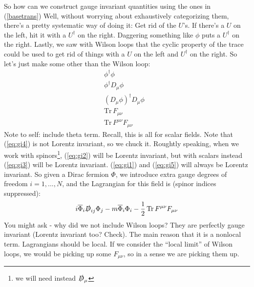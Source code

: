 \documentclass[main.tex]{subfiles}
\begin{document}
So how can we construct gauge invariant quantities using the ones in (\ref{basetrans}) Well, without worrying about exhaustively categorizing them, there's a pretty systematic way of doing it: Get rid of the $U$'s. If there's a $U$ on the left, hit it with a $U^\dagger$ on the right. Daggering something like $\phi$ puts a $U^\dagger$ on the right. Lastly, we saw with Wilson loops that the cyclic property of the trace could be used to get rid of things with a $U$ on the left and $U^\dagger$ on the right. So let's just make some other than the Wilson loop:
\begin{subequations} \label{eq:gaugeinv}
\begin{align}
\phi^\dagger \phi & \label{eq:gi1} \\
\phi^\dagger D_\mu \phi & \label{eq:gi2}\\
(D_\mu \phi)^\dagger D_\mu \phi & \label{eq:gi3} \\
\text{Tr} \, F_{\mu \nu} & \label{eq:gi4}\\
\text{Tr} \, F^{\mu \nu} F_{\mu \nu} & \label{eq:gi5}
\end{align}
\end{subequations}
Note to self: include theta term. Recall, this is all for scalar fields. Note that (\ref{eq:gi4}) is not Lorentz invariant, so we chuck it. Roughtly speaking, when we work with spinors\footnote{we will need instead $\slashed{D}_\mu$}, (\ref{eq:gi2}) will be Lorentz invariant, but with scalars instead (\ref{eq:gi3}) will be Lorentz invariant.  (\ref{eq:gi1}) and (\ref{eq:gi5}) will always be Lorentz invariant. So given a Dirac fermion $\Phi$, we introduce extra gauge degrees of freedom $i=1,...,N$, and the Lagrangian for this field is (spinor indices suppressed):
\label{eq:nicelag}
\begin{equation}
i \overline{\Phi}_{i} \slashed{D}_{ij} \Phi_j - m \overline{\Phi}_i \Phi_i -\frac{1}{2} \, \text{Tr} \, F^{\mu \nu} F_{\mu \nu}
\end{equation}
You might ask - why did we not include Wilson loops? They are perfectly gauge invariant (Lorentz invariant too? Check). The main reason that it is a nonlocal term.\cite{PSE1} Lagrangians should be local. If we consider the ``local limit'' of Wilson loops, we would be picking up some $F_{\mu \nu}$, so in a sense we are picking them up.
\end{document}
